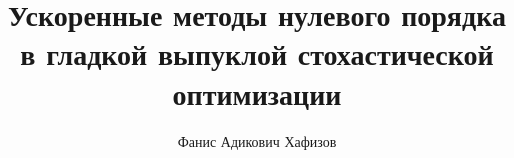\documentclass{beamer}
\title[\hbox to 56mm{Ускоренные безградиентные методы}]{Ускоренные методы нулевого порядка в гладкой выпуклой стохастической оптимизации}
\author[Ф.\,А. Хафизов]{Фанис Адикович Хафизов}
\institute{Московский физико-технический институт}
\date{\footnotesize
\par\smallskip\emph{Курс:} Автоматизация научных исследований\par (практика, В.\,В.~Стрижов)/Группа 105
\par\smallskip\emph{Эксперт:} А.\,Н.~Безносиков
\par\smallskip\emph{Консультант:} А.\,И.~Богданов
\par\bigskip\small 2024}
\begin{document}
\begin{frame}
\thispagestyle{empty}
\maketitle
\end{frame}
\end{document}
